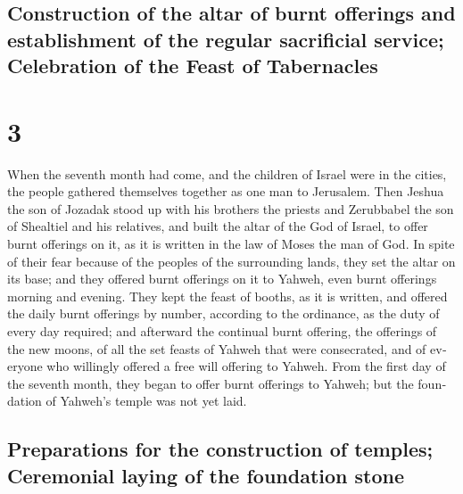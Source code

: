 \begin{paracol}{2}
\switchcolumn
\begin{otherlanguage}{english}

\hypertarget{construction-of-the-altar-of-burnt-offerings-and-establishment-of-the-regular-sacrificial-service-celebration-of-the-feast-of-tabernacles}{%
\subsection{Construction of the altar of burnt offerings and
establishment of the regular sacrificial service; Celebration of the
Feast of
Tabernacles}\label{construction-of-the-altar-of-burnt-offerings-and-establishment-of-the-regular-sacrificial-service-celebration-of-the-feast-of-tabernacles}}

\hypertarget{section-5}{%
\section{3}\label{section-5}}

 When the seventh month had come, and the children of
Israel were in the cities, the people gathered themselves together as
one man to Jerusalem.  Then Jeshua the son of Jozadak
stood up with his brothers the priests and Zerubbabel the son of
Shealtiel and his relatives, and built the altar of the God of Israel,
to offer burnt offerings on it, as it is written in the law of Moses the
man of God.  In spite of their fear because of the peoples
of the surrounding lands, they set the altar on its base; and they
offered burnt offerings on it to Yahweh, even burnt offerings morning
and evening.  They kept the feast of booths, as it is
written, and offered the daily burnt offerings by number, according to
the ordinance, as the duty of every day required;  and
afterward the continual burnt offering, the offerings of the new moons,
of all the set feasts of Yahweh that were consecrated, and of everyone
who willingly offered a free will offering to Yahweh. 
From the first day of the seventh month, they began to offer burnt
offerings to Yahweh; but the foundation of Yahweh's temple was not yet
laid.

\hypertarget{preparations-for-the-construction-of-temples-ceremonial-laying-of-the-foundation-stone}{%
\subsection{Preparations for the construction of temples; Ceremonial
laying of the foundation
stone}\label{preparations-for-the-construction-of-temples-ceremonial-laying-of-the-foundation-stone}}


\end{otherlanguage}
\end{paracol}
